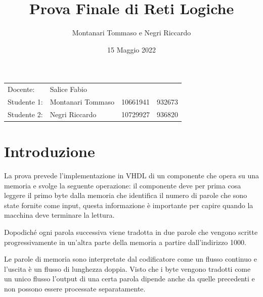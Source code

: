 \documentclass{article}
\title{Prova Finale di Reti Logiche} %
\author{Montanari Tommaso e Negri Riccardo} %
\date{15 Maggio 2022}
\begin{document}
\maketitle %
\begin{center}
\begin{tabular}{l l l l}
Docente: & Salice Fabio & & \\ 
Studente 1: & Montanari Tommaso & 10661941 & 932673\\
Studente 2: & Negri Riccardo & 10729927 & 936820 
\end{tabular}
\end{center}

\tableofcontents
\pagebreak


\section{Introduzione}

La prova prevede l'implementazione in VHDL di un componente che opera su una memoria e svolge la seguente operazione: il componente deve per prima cosa leggere il primo byte dalla memoria che identifica il numero di parole che sono
state fornite come input, questa informazione è importante per capire quando la macchina deve terminare la lettura.

Dopodiché ogni parola successiva viene tradotta in due parole che vengono scritte progressivamente in un'altra parte della memoria a partire dall'indirizzo 1000.

Le parole di memoria sono interpretate dal codificatore come un flusso continuo e l'uscita è un flusso di lunghezza doppia. Visto che i byte vengono tradotti come un unico flusso l'output di una certa parola dipende anche da quelle precedenti e non possono essere processate separatamente.
\end{document}
